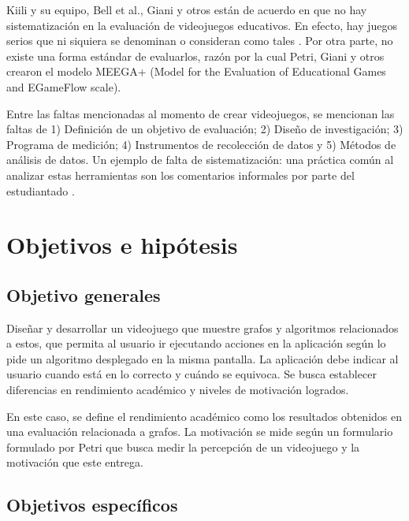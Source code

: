 \documentclass[submission]{eptcs}
\begin{document}
Kiili y su equipo, Bell et al., Giani y otros \cite{petri2018method} están de acuerdo en que no hay sistematización en la evaluación de
videojuegos educativos. En efecto, hay juegos serios que ni siquiera se denominan o consideran como tales
\cite{evaluation_of_games_for_teaching_cs}. Por otra parte, no existe una forma estándar de evaluarlos, razón por
la cual Petri, Giani y otros \cite{petri2018method} crearon el modelo MEEGA+ (Model for the Evaluation of Educational
Games and EGameFlow scale).

Entre las faltas mencionadas al momento de crear videojuegos, se mencionan las faltas de 1) Definición de un objetivo
de evaluación; 2) Diseño de investigación; 3) Programa de medición; 4) Instrumentos de recolección de datos y 5) Métodos
de análisis de datos. Un ejemplo de falta de sistematización: una práctica común al analizar estas herramientas son los 
comentarios informales por parte del estudiantado \cite{petri2018method}.


\section{Objetivos e hipótesis}

\subsection{Objetivo generales}



Diseñar y desarrollar un videojuego que muestre grafos y algoritmos relacionados a estos,
que permita al usuario ir ejecutando acciones en la aplicación según lo pide un algoritmo
desplegado en la misma pantalla. La aplicación debe indicar al usuario cuando está en lo
correcto y cuándo se equivoca.
Se busca establecer diferencias en rendimiento académico y niveles de motivación logrados.

En este caso, se define el rendimiento académico como los resultados obtenidos en una evaluación relacionada a grafos.
La motivación se mide según un formulario formulado por Petri \cite{petri2018meegaplus} que busca medir la percepción de un
videojuego y la motivación que este entrega.


\subsection{Objetivos específicos}
\end{document}
